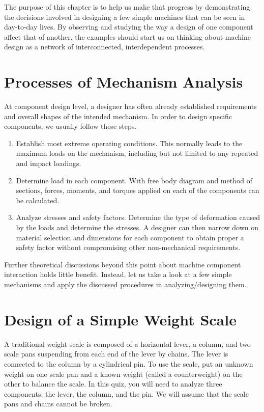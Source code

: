 \documentclass[
10pt,
a4paper,
openany,
svgnames,
]{book}
\begin{document}
The purpose of this chapter is to help us make that progress by demonstrating the decisions involved in designing a few simple machines that can be seen in day-to-day lives. By observing and studying the way a design of one component affect that of another, the examples should start us on thinking about machine design as a network of interconnected, interdependent processes.

\section{Processes of Mechanism Analysis}

At component design level, a designer has often already established requirements and overall shapes of the intended mechanism. In order to design specific components, we usually follow these steps.
\begin{enumerate}
\item Establish most extreme operating conditions. This normally leads to the maximum loads on the mechanism, including but not limited to any repeated and impact loadings.
\item Determine load in each component. With free body diagram and method of sections, forces, moments, and torques applied on each of the components can be calculated.
\item Analyze stresses and safety factors. Determine the type of deformation caused by the loads and determine the stresses. A designer can then narrow down on material selection and dimensions for each component to obtain proper a safety factor without compromising other non-mechanical requirements.
\end{enumerate}
Further theoretical discussions beyond this point about machine component interaction holds little benefit. Instead, let us take a look at a few simple mechanisms and apply the discussed procedures in analyzing/designing them. 

\section{Design of a Simple Weight Scale}

A traditional weight scale is composed of a horizontal lever, a column, and two scale pans suspending from each end of the lever by chains. The lever is connected to the column by a cylindrical pin. To use the scale, put an unknown weight on one scale pan and a known weight (called a counterweight) on the other to balance the scale. In this quiz, you will need to analyze three components: the lever, the column, and the pin. We will assume that the scale pans and chains cannot be broken.
\end{document}
